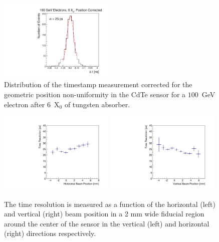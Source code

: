 \begin{figure}[htbp] 
\centering
\includegraphics[width=0.49\textwidth]{figures/CdTeTimingResolution_100GeV_PositionCorrected.pdf} 
\caption{Distribution of the timestamp measurement corrected for the geometric position
non-uniformity in the CdTe sensor for a $100$~GeV electron after $6$~$\mathrm{X}_{0}$ of tungsten absorber. } 
\label{fig:DeltaTCorr} 
\end{figure} 



\begin{figure}[htbp] 
\centering
\includegraphics[width=0.49\textwidth]{figures/TimeResolutionVsBeamHorizontalPosition.pdf} 
\includegraphics[width=0.49\textwidth]{figures/TimeResolutionVsBeamVerticalPosition.pdf} 
\caption{ The time resolution is measured as a function of the horizontal (left) and vertical (right)
beam position in a 2 mm wide fiducial region around the center of the sensor in the vertical (left) 
and horizontal (right) directions respectively. }
\label{fig:TimeResolutionVsBeamXY} 
\end{figure} 


